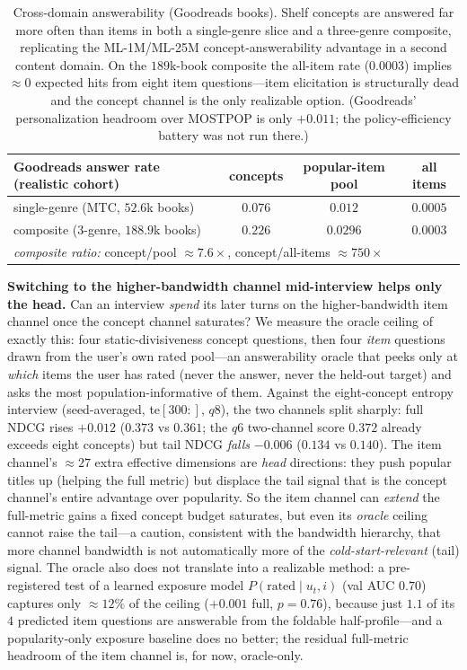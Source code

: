 \documentclass[11pt]{article}
\begin{document}
\begin{table}[h]\centering\small
\begin{tabular}{lccc}
\toprule
Goodreads answer rate (realistic cohort) & concepts & popular-item pool & all items \\
\midrule
single-genre (MTC, $52.6$k books) & $0.076$ & $0.012$ & $0.0005$ \\
composite (3-genre, $188.9$k books) & $0.226$ & $0.0296$ & $0.0003$ \\
\midrule
\multicolumn{4}{l}{\emph{composite ratio:} concept/pool $\approx7.6\times$, concept/all-items $\approx750\times$}\\
\bottomrule
\end{tabular}
\caption{Cross-domain answerability (Goodreads books). Shelf concepts are answered far more often than items in both a
single-genre slice and a three-genre composite, replicating the ML-1M/ML-25M concept-answerability advantage in a second
content domain. On the $189$k-book composite the all-item rate ($0.0003$) implies $\approx0$ expected hits from eight
item questions---item elicitation is structurally dead and the concept channel is the only realizable option. (Goodreads'
personalization headroom over MOSTPOP is only $+0.011$; the policy-efficiency battery was not run there.)}
\label{tab:goodreads_answer}
\end{table}

\textbf{Switching to the higher-bandwidth channel mid-interview helps only the head.} Can an interview \emph{spend} its
later turns on the higher-bandwidth item channel once the concept channel saturates? We measure the oracle ceiling of
exactly this: four static-divisiveness concept questions, then four \emph{item} questions drawn from the user's own
rated pool---an answerability oracle that peeks only at \emph{which} items the user has rated (never the answer, never
the held-out target) and asks the most population-informative of them. Against the eight-concept entropy interview
(seed-averaged, te$[300{:}]$, $q8$), the two channels split sharply: full NDCG rises $+0.012$ ($0.373$ vs $0.361$; the
$q6$ two-channel score $0.372$ already exceeds eight concepts) but tail NDCG \emph{falls} $-0.006$ ($0.134$ vs $0.140$).
The item channel's $\approx27$ extra effective dimensions are \emph{head} directions: they push popular titles up
(helping the full metric) but displace the tail signal that is the concept channel's entire advantage over popularity.
So the item channel can \emph{extend} the full-metric gains a fixed concept budget saturates, but even its \emph{oracle}
ceiling cannot raise the tail---a caution, consistent with the bandwidth hierarchy, that more channel bandwidth is not
automatically more of the \emph{cold-start-relevant} (tail) signal. The oracle also does not translate into a realizable
method: a pre-registered test of a learned exposure model $P(\text{rated}\mid u_t, i)$ (val AUC $0.70$) captures only
$\approx\!12\%$ of the ceiling ($+0.001$ full, $p{=}0.76$), because just $1.1$ of its $4$ predicted item questions are
answerable from the foldable half-profile---and a popularity-only exposure baseline does no better; the residual
full-metric headroom of the item channel is, for now, oracle-only.
\end{document}
